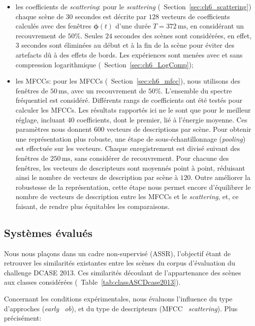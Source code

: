 \begin{itemize}
\item les coefficients de \emph{scattering}: pour le \emph{scattering} (\cf~Section~\ref{sec:ch6_scattering}) chaque scène de $30$ secondes est décrite par $128$ vecteurs de coefficients calculés avec des fenêtres $\boldsymbol{\phi}(t)$ d'une durée $T=372\,\mathrm{ms}$, en considérant un recouvrement de $50\%$. Seules $24$ secondes des scènes sont considérées, en effet, $3$ secondes sont éliminées au début et à la fin de la scène pour éviter des artefacts dû à des effets de bords. Les expériences sont menées avec et sans compression logarithmique (\cf~Section~\ref{sec:ch6_LogComp});
\item les MFCCs:  pour les MFCCs (\cf~Section~\ref{sec:ch6_mfcc}), nous utilisons des fenêtres de $50\,\mathrm{ms}$, avec un recouvrement de $50\%$. L'ensemble du spectre fréquentiel est considéré. Différents rangs de coefficients ont été testés pour calculer les MFCCs. Les résultats rapportés ici ne le sont que pour le meilleur réglage, incluant 40 coefficients, dont le premier, lié à l'énergie moyenne. Ces paramètres nous donnent $600$ vecteurs de descriptions par scène. Pour obtenir une représentation plus robuste, une étape de sous-échantillonnage (\emph{pooling}) est effectuée sur les vecteurs\citep{Tzanetakis2002musical}. Chaque enregistrement est divisé suivant des fenêtres de $250\,\mathrm{ms}$, sans considérer de recouvrement. Pour chacune des fenêtres, les vecteurs de descripteurs sont moyennés point à point, réduisant ainsi le nombre de vecteurs de description par scène à $120$. Outre améliorer la robustesse de la représentation, cette étape nous permet encore d'équilibrer le nombre de vecteurs de description entre les MFCCs et le \emph{scattering}, et, ce faisant, de rendre plus équitables les comparaisons.
\end{itemize}

\subsection{Systèmes évalués}

Nous nous plaçons dans un cadre non-supervisé (ASSR), l'objectif étant de retrouver les similarités existantes entre les scènes du corpus d'évaluation du challenge DCASE 2013. Ces similarités découlant de l'appartenance des scènes aux classes considérées (\cf~Table~\ref{tab:classASCDcase2013}).

Concernant les conditions expérimentales, nous évaluons l'influence du type d'approches (\emph{early} \vs~\emph{ob}), et du type de descripteurs (MFCC \vs~\emph{scattering}). Plus précisément:

